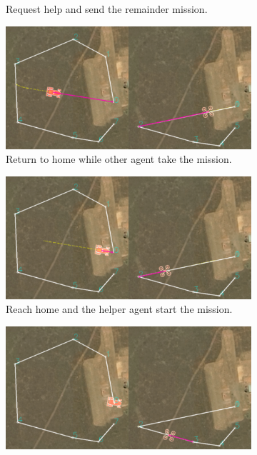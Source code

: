 \begin{figure}
\begin{subfigure}[b]{0.9\columnwidth}
    \caption{Request help and send the remainder mission.}
  \end{subfigure}
  \begin{subfigure}[b]{0.9\columnwidth}
    \includegraphics[width=\textwidth]{img/mission7.png}
    \caption{Return to home while other agent take the mission.}
  \end{subfigure}
  \begin{subfigure}[b]{0.9\columnwidth}
    \includegraphics[width=\textwidth]{img/mission8.png}
    \caption{Reach home and the helper agent start the mission.}
  \end{subfigure}
  \begin{subfigure}[b]{0.9\columnwidth}
    \includegraphics[width=\textwidth]{img/mission9.png}

\end{subfigure}
\end{figure}

